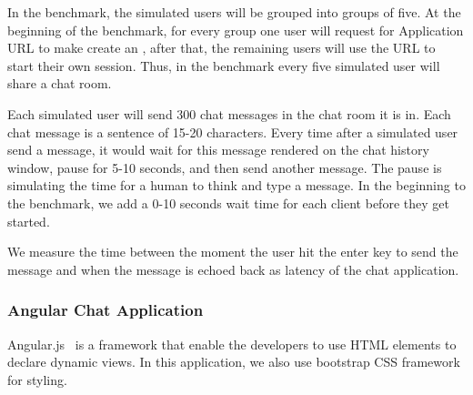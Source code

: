 In the benchmark, 
the simulated users will be grouped into groups of five.
At the beginning of the benchmark, 
for every group one user will request for Application URL to make 
\cb{} create an \appins{},
after that, the remaining users will use the \appins{} URL to start
their own session.
Thus, in the benchmark every five simulated user will share a chat room.

Each simulated user will send 300 chat messages in the chat room it is in.
Each chat message is a sentence of 15-20 characters.
Every time after a simulated user send a message,
it would wait for this message rendered on the chat history window,
pause for 5-10 seconds,
and then send another message.
The pause is simulating the time for a human to think and type a message.
In the beginning to the benchmark, 
we add a 0-10 seconds wait time for each client before they get started.

We measure the time between the moment 
the user hit the enter key to send the message and
when the message is echoed back as latency of the chat application.











\subsubsection{Angular Chat Application}
\label{sec:angular}
Angular.js~\cite{angular} is a \js{} framework that enable the developers to 
use HTML elements to declare dynamic views.
In this application, we also use bootstrap CSS framework for styling.


